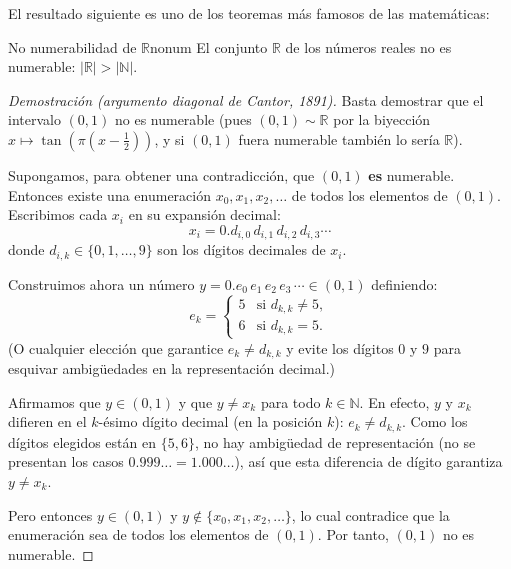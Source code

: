 El resultado siguiente es uno de los teoremas más famosos de las matemáticas:

\begin{teorema}{No numerabilidad de $\mathbb{R}$}{nonum}
El conjunto $\mathbb{R}$ de los números reales no es numerable: $|\mathbb{R}| > |\mathbb{N}|$.
\end{teorema}

\begin{proof}[Demostración (argumento diagonal de Cantor, 1891)]
Basta demostrar que el intervalo $(0,1)$ no es numerable (pues $(0,1) \sim \mathbb{R}$ por la biyección $x \mapsto \tan(\pi(x - \frac{1}{2}))$, y si $(0,1)$ fuera numerable también lo sería $\mathbb{R}$).

Supongamos, para obtener una contradicción, que $(0,1)$ \textbf{es} numerable. Entonces existe una enumeración $x_0, x_1, x_2, \ldots$ de todos los elementos de $(0,1)$. Escribimos cada $x_i$ en su expansión decimal:
\[
  x_i = 0.d_{i,0}\, d_{i,1}\, d_{i,2}\, d_{i,3} \cdots
\]
donde $d_{i,k} \in \{0, 1, \ldots, 9\}$ son los dígitos decimales de $x_i$.

Construimos ahora un número $y = 0.e_0\, e_1\, e_2\, e_3\,\cdots \in (0,1)$ definiendo:
\[
  e_k = \begin{cases} 5 & \text{si } d_{k,k} \neq 5, \\ 6 & \text{si } d_{k,k} = 5. \end{cases}
\]
(O cualquier elección que garantice $e_k \neq d_{k,k}$ y evite los dígitos $0$ y $9$ para esquivar ambigüedades en la representación decimal.)

Afirmamos que $y \in (0,1)$ y que $y \neq x_k$ para todo $k \in \mathbb{N}$. En efecto, $y$ y $x_k$ difieren en el $k$-ésimo dígito decimal (en la posición $k$): $e_k \neq d_{k,k}$. Como los dígitos elegidos están en $\{5, 6\}$, no hay ambigüedad de representación (no se presentan los casos $0.999\ldots = 1.000\ldots$), así que esta diferencia de dígito garantiza $y \neq x_k$.

Pero entonces $y \in (0,1)$ y $y \notin \{x_0, x_1, x_2, \ldots\}$, lo cual contradice que la enumeración sea de todos los elementos de $(0,1)$. Por tanto, $(0,1)$ no es numerable.
\end{proof}

